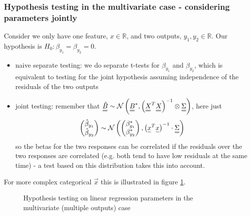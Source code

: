 \subsubsection{Hypothesis testing in the multivariate case - considering parameters jointly}

Consider we only have one feature, $x \in \mathbb{R}$, and two outputs, $y_1, y_2 \in \mathbb{R}$. Our hypothesis
is $H_0: \beta_{y_1} = \beta_{y_2} = 0$.
\begin{itemize}
    \item naive separate testing: we do separate t-tests for $\beta_{y_1}$ and $\beta_{y_2}$,
    which is equivalent to testing for the joint hypothesis assuming independence of the residuals
    of the two outputs
    \item joint testing: remember that $\mat{\hat{B}} \sim \mathcal{N}\left(\mat{B}^*, \left( \mat{X}^T \mat{X} \right)^{-1} \otimes \mat{\Sigma} \right)$, here
    just
    \begin{equation}
        \begin{pmatrix}
            \hat{\beta}_{y_1} \\
            \hat{\beta}_{y_2}
        \end{pmatrix} \sim \mathcal{N}\left(\begin{pmatrix}
            \beta_{y_1}^* \\
            \beta_{y_2}^*
        \end{pmatrix}, \left( \vec{x}^T \vec{x} \right)^{-1} \cdot \mat{\Sigma} \right)
    \end{equation}
    so the betas for the two responses can be correlated if the residuals over the two
    responses are correlated (e.g. both tend to have low residuals at the same time) -
    a test based on this distribution takes this into account.
\end{itemize}

For more complex categorical $\vec{x}$ this is illustrated in figure \ref{fig:multivariate_hypothesis}.

\begin{figure}[!htb]
 \centering
 \hfill
 \caption{Hypothesis testing on linear regression parameters in the multivariate (multiple outputs) case}
 \label{fig:multivariate_hypothesis}
\end{figure}

